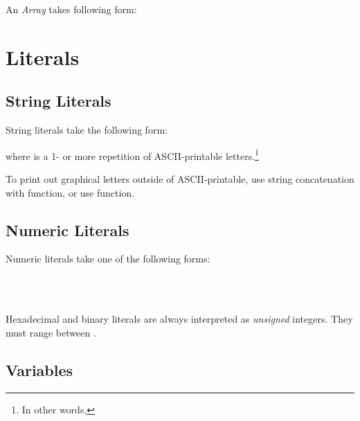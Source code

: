 An \emph{Array} takes following form:


\section{Literals}
\subsection{String Literals}

String literals take the following form:


where  is a 1- or more repetition of ASCII-printable letters.\footnote{In other words, }

To print out graphical letters outside of ASCII-printable, use string concatenation with  function, or use  function.

\subsection{Numeric Literals} 

Numeric literals take one of the following forms:

\\
\\

Hexadecimal and binary literals are always interpreted as \emph{unsigned} integers. They must range between \intrange.

\subsection{Variables} 

